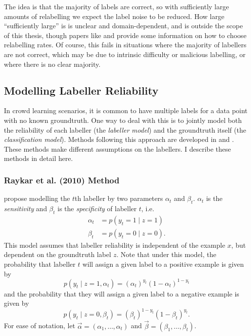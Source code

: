         The idea is that the majority of labels are correct, so with sufficiently large amounts of relabelling we expect the label noise to be reduced. How large ``sufficiently large'' is is unclear and domain-dependent, and is outside the scope of this thesis, though papers like \citet{sheng08} and \citet{lin16} provide some information on how to choose relabelling rates. Of course, this fails in situations where the majority of labellers are not correct, which may be due to intrinsic difficulty or malicious labelling, or where there is no clear majority.

    \subsection{Modelling Labeller Reliability}

        In crowd learning scenarios, it is common to have multiple labels for a data point with no known groundtruth. One way to deal with this is to jointly model both the reliability of each labeller (the \emph{labeller model}) and the groundtruth itself (the \emph{classification model}). Methods following this approach are developed in \citet{raykar10} and \citet{yan10}. These methods make different assumptions on the labellers. I describe these methods in detail here.

        \subsubsection{Raykar et al. (2010) Method}
            \label{sec:raykar}

            \citet{raykar10} propose modelling the $t$th labeller by two parameters $\alpha_t$ and $\beta_t$. $\alpha_t$ is the \emph{sensitivity} and $\beta_t$ is the \emph{specificity} of labeller $t$, i.e.
            \begin{align*}
                \alpha_t &= p(y_t = 1 \mid z = 1)\\
                \beta_t &= p(y_t = 0 \mid z = 0).
            \end{align*}
            This model assumes that labeller reliability is independent of the example $x$, but dependent on the groundtruth label $z$. Note that under this model, the probability that labeller $t$ will assign a given label to a positive example is given by
            \begin{equation*}
                p(y_t \mid z = 1, \alpha_t) = (\alpha_t)^{y_t} (1 - \alpha_t)^{1 - y_t}
            \end{equation*}
            and the probability that they will assign a given label to a negative example is given by
            \begin{equation*}
                p(y_t \mid z = 0, \beta_t) = (\beta_t)^{1 - y_t} (1 - \beta_t)^{y_t}.
            \end{equation*}
            For ease of notation, let $\vec \alpha = (\alpha_1, \dots, \alpha_t)$ and $\vec \beta = (\beta_1, \dots, \beta_t)$.

